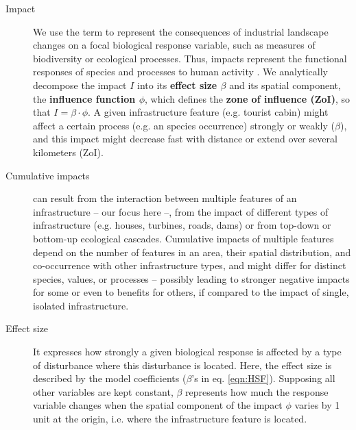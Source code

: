 \documentclass[titlepage]{article}
\begin{document}
\begin{tcolorbox}[width=1.3\textwidth,center,colback=yellow!5,colframe=yellow!75!black,title={Box 1 -- Definitions}]

\begin{description}

    \item[Impact] We use the term to represent the consequences of industrial landscape changes on a focal biological response variable, such as measures of biodiversity or ecological processes. Thus, impacts represent the functional responses of species and processes to human activity \citep{naugle_unifying_2011}. We analytically decompose the impact $I$ into its \textbf{effect size $\beta$} and its spatial component, the \textbf{influence function $\phi$}, which defines the \textbf{zone of influence (ZoI)}, so that $I = \beta \cdot \phi$. A given infrastructure feature (e.g. tourist cabin) might affect a certain process (e.g. an species occurrence) strongly or weakly ($\beta$), and this impact might decrease fast with distance or extend over several kilometers (ZoI).
    
    \item[Cumulative impacts] can result from the interaction between multiple features of an infrastructure -- our focus here --, from the impact of different types of infrastructure (e.g. houses, turbines, roads, dams) or from top-down or bottom-up ecological cascades. Cumulative impacts of multiple features depend on the number of features in an area, their spatial distribution, and co-occurrence with other infrastructure types, and might differ for distinct species, values, or processes -- possibly leading to stronger negative impacts for some or even to benefits for others, if compared to the impact of single, isolated infrastructure.
    
    \item[Effect size] It expresses how strongly a given biological response is affected by a type of disturbance where this disturbance is located. Here, the effect size is described by the model coefficients ($\beta$'s in eq. \ref{eqn:HSF}). Supposing all other variables are kept constant, $\beta$ represents how much the response variable changes when the spatial component of the impact $\phi$ varies by 1 unit at the origin, i.e. where the infrastructure feature is located.
    

\end{description}
\end{tcolorbox}
\end{document}
